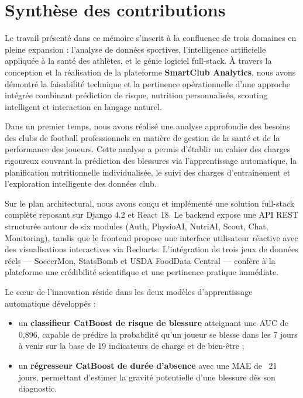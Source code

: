 \documentclass{modificopy}
\begin{document}
\section*{Synthèse des contributions}

Le travail présenté dans ce mémoire s'inscrit à la confluence de trois domaines en pleine expansion : l'analyse de données sportives, l'intelligence artificielle appliquée à la santé des athlètes, et le génie logiciel full-stack. À travers la conception et la réalisation de la plateforme \textbf{SmartClub Analytics}, nous avons démontré la faisabilité technique et la pertinence opérationnelle d'une approche intégrée combinant prédiction de risque, nutrition personnalisée, scouting intelligent et interaction en langage naturel.

Dans un premier temps, nous avons réalisé une analyse approfondie des besoins des clubs de football professionnels en matière de gestion de la santé et de la performance des joueurs. Cette analyse a permis d'établir un cahier des charges rigoureux couvrant la prédiction des blessures via l'apprentissage automatique, la planification nutritionnelle individualisée, le suivi des charges d'entraînement et l'exploration intelligente des données club.

Sur le plan architectural, nous avons conçu et implémenté une solution full-stack complète reposant sur Django 4.2 et React 18. Le backend expose une API REST structurée autour de six modules (Auth, PhysioAI, NutriAI, Scout, Chat, Monitoring), tandis que le frontend propose une interface utilisateur réactive avec des visualisations interactives via Recharts. L'intégration de trois jeux de données réels — SoccerMon, StatsBomb et USDA FoodData Central — confère à la plateforme une crédibilité scientifique et une pertinence pratique immédiate.

Le cœur de l'innovation réside dans les deux modèles d'apprentissage automatique développés :

\begin{itemize}
    \item un \textbf{classifieur CatBoost de risque de blessure} atteignant une AUC de 0,896, capable de prédire la probabilité qu'un joueur se blesse dans les 7 jours à venir sur la base de 19 indicateurs de charge et de bien-être ;
    \item un \textbf{régresseur CatBoost de durée d'absence} avec une MAE de ~21 jours, permettant d'estimer la gravité potentielle d'une blessure dès son diagnostic.
\end{itemize}
\end{document}
